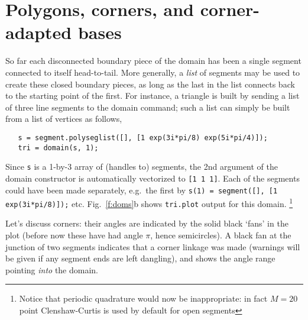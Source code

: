 

\section{Polygons, corners, and corner-adapted bases}
\label{s:poly}

So far each disconnected boundary piece of the domain
has been a single segment connected to itself head-to-tail.
More generally, a {\em list} of segments may be used to create 
these closed boundary pieces, as long as the last in the list
connects back to the starting point of the first.
For instance, a triangle is built by sending a list of
three line segments to the domain command;
such a list can simply be built from a list of vertices as follows,
\begin{verbatim}
   s = segment.polyseglist([], [1 exp(3i*pi/8) exp(5i*pi/4)]);
   tri = domain(s, 1);
\end{verbatim}
Since {\tt s} is a 1-by-3 array of (handles to) segments,
the 2nd argument of the domain constructor
is automatically vectorized to {\tt [1 1 1]}.
Each of the segments could have been made separately, e.g.\ the first by
{\tt s(1) = segment([], [1 exp(3i*pi/8)]);} etc.
Fig.~\ref{f:doms}b shows {\tt tri.plot} output for this domain.%
  \footnote{Notice that periodic quadrature would now be inappropriate:
    in fact $M=20$ point Clenshaw-Curtis is used by default for open
    segments}

Let's discuss corners: their angles are indicated by the solid black
`fans' in the plot (before now these have had angle $\pi$, hence semicircles).
A black fan at the junction of two segments indicates that a corner
linkage was made (warnings will be given if any segment ends are left
dangling), and shows the angle range pointing {\em into} the domain.

